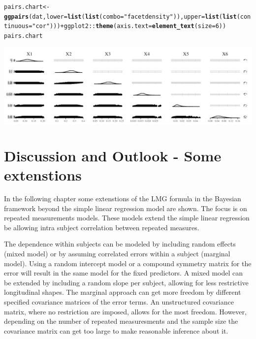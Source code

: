 \documentclass[11pt,a4paper,twoside]{book}\usepackage[]{graphicx}\usepackage[]{color}
\makeatletter
\newcommand{\hlnum}[1]{\textcolor[rgb]{0.686,0.059,0.569}{#1}}%
\newcommand{\hlstr}[1]{\textcolor[rgb]{0.192,0.494,0.8}{#1}}%
\newcommand{\hlopt}[1]{\textcolor[rgb]{0,0,0}{#1}}%
\newcommand{\hlstd}[1]{\textcolor[rgb]{0.345,0.345,0.345}{#1}}%
\newcommand{\hlkwb}[1]{\textcolor[rgb]{0.69,0.353,0.396}{#1}}%
\newcommand{\hlkwc}[1]{\textcolor[rgb]{0.333,0.667,0.333}{#1}}%
\newcommand{\hlkwd}[1]{\textcolor[rgb]{0.737,0.353,0.396}{\textbf{#1}}}%
\newenvironment{kframe}{%
 \def\at@end@of@kframe{}%
 \ifinner\ifhmode%
  \def\at@end@of@kframe{\end{minipage}}%
  \begin{minipage}{\columnwidth}%
 \fi\fi%
 \def\FrameCommand##1{\hskip\@totalleftmargin \hskip-\fboxsep
 \colorbox{shadecolor}{##1}\hskip-\fboxsep
     \hskip-\linewidth \hskip-\@totalleftmargin \hskip\columnwidth}%
 \MakeFramed {\advance\hsize-\width
   \@totalleftmargin\z@ \linewidth\hsize
   \@setminipage}}%
 {\par\unskip\endMakeFramed%
 \at@end@of@kframe}
\newenvironment{knitrout}{}{} %
\makeatother
\begin{document}
\begin{knitrout}
\begin{kframe}
\begin{alltt}
\hlstd{pairs.chart} \hlkwb{<-} \hlkwd{ggpairs}\hlstd{(dat,} \hlkwc{lower} \hlstd{=} \hlkwd{list}\hlstd{(}\hlkwd{list}\hlstd{(}\hlkwc{combo} \hlstd{=} \hlstr{"facetdensity"}\hlstd{)),} \hlkwc{upper} \hlstd{=} \hlkwd{list}\hlstd{(}\hlkwd{list}\hlstd{(}\hlkwc{continuous} \hlstd{=} \hlstr{"cor"}\hlstd{)))} \hlopt{+} \hlstd{ggplot2}\hlopt{::}\hlkwd{theme}\hlstd{(}\hlkwc{axis.text} \hlstd{=} \hlkwd{element_text}\hlstd{(}\hlkwc{size} \hlstd{=} \hlnum{6}\hlstd{))}
\hlstd{pairs.chart}
\end{alltt}
\end{kframe}

{\centering \includegraphics[width=\textwidth-3cm]{figure/ch03_figreal_data_LMG-2} 

}



\end{knitrout}















\chapter{Discussion and Outlook - Some extenstions}

In the following chapter some extenstions of the LMG formula in the Bayesian framework beyond the simple linear regression model are shown. The focus is on repeated measurements models. These models extend the simple linear regression be allowing intra subject correlation between repeated measures. 

The dependence within subjects can be modeled by including random effects (mixed model) or by assuming correlated errors within a subject (marginal model). Using a random intercept model or a compound symmetry matrix for the error will result in the same model for the fixed predictors. A mixed model can be extended by including a random slope per subject, allowing for less restrictive longitudinal shapes. The marginal approach can get more freedom by different specified covariance matrices of the error terms. An unstructured covariance matrix, where no restriction are imposed, allows for the most freedom. However, depending on the number of repeated measuresments and the sample size the covariance matrix can get too large to make reasonable inference about it. 
\end{document}
